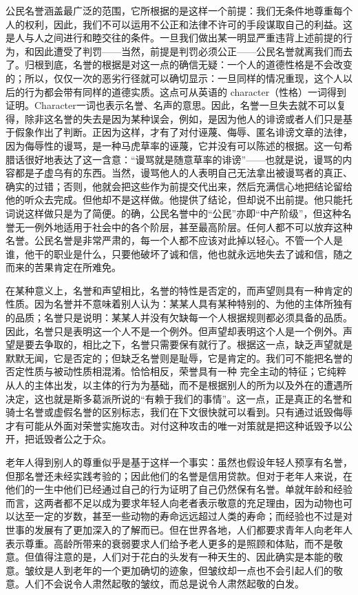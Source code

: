 \documentclass[12pt,oneside]{book}
\begin{document}
公民名誉涵盖最广泛的范围，它所根据的是这样一个前提：我们无条件地尊重每个人的权利，因此，我们不可以运用不公正和法律不许可的手段谋取自己的利益。这是人与人之间进行和睦交往的条件。一旦我们做出某一明显严重违背上述前提的行为，和因此遭受了判罚——当然，前提是判罚必须公正——公民名誉就离我们而去了。归根到底，名誉的根据是对这一点的确信无疑：一个人的道德性格是不会改变的；所以，仅仅一次的恶劣行径就可以确切显示：一旦同样的情况重现，这个人以后的行为都会带有同样的道德实质。这点可从英语的
character（性格）一词得到证明。Character一词也表示名誉、名声的意思。因此，名誉一旦失去就不可以复得，除非这名誉的失去是因为某种误会，例如，是因为他人的诽谤或者人们只是基于假象作出了判断。正因为这样，才有了对付诬蔑、侮辱、匿名诽谤文章的法律，因为侮辱性的谩骂，是一种马虎草率的诬蔑，它并没有可以陈述的根据。这一句希腊话很好地表达了这一含意：“谩骂就是随意草率的诽谤”——也就是说，谩骂的内容都是子虚乌有的东西。当然，谩骂他人的人表明自己无法拿出被谩骂者的真正、确实的过错；否则，他就会把这些作为前提交代出来，然后充满信心地把结论留给他的听众去完成。但他却不是这样做。他提供了结论，但却说不出前提。他只能托词说这样做只是为了简便。的确，公民名誉中的“公民”亦即“中产阶级”，但这种名誉无一例外地适用于社会中的各个阶层，甚至最高阶层。任何人都不可以放弃这种名誉。公民名誉是非常严肃的，每一个人都不应该对此掉以轻心。不管一个人是谁，他干的职业是什么，只要他破坏了诚和信，他也就永远地失去了诚和信，随之而来的苦果肯定在所难免。 

在某种意义上，名誉和声望相比，名誉的特性是否定的，而声望则具有一种肯定的性质。因为名誉并不意味着别人认为：某某人具有某种特别的、为他的主体所独有的品质；名誉只是说明：某某人并没有欠缺每一个人根据规则都必须具备的品质。因此，名誉只是表明这一个人不是一个例外。但声望却表明这个人是一个例外。声望是要去争取的，相比之下，名誉只需要保有就行了。根据这一点，缺乏声望就是默默无闻，它是否定的；但缺乏名誉则是耻辱，它是肯定的。我们可不能把名誉的否定性质与被动性质相混淆。恰恰相反，荣誉具有一种
完全主动的特征；它纯粹从人的主体出发，以主体的行为为基础，而不是根据别人的所为以及外在的遭遇所决定，这也就是斯多葛派所说的“有赖于我们的事情”。这一点，正是真正的名誉和骑士名誉或虚假名誉的区别标志，我们在下文很快就可以看到。只有通过诋毁侮辱才有可能从外面对荣誉实施攻击。对付这种攻击的唯一对策就是把这种诋毁予以公开，把诋毁者公之于众。 

老年人得到别人的尊重似乎是基于这样一个事实：虽然也假设年轻人预享有名誉，但那名誉还未经实践考验的；因此他们的名誉是信用贷款。但对于老年人来说，在他们的一生中他们已经通过自己的行为证明了自己仍然保有名誉。单就年龄和经验而言，这两者都不足以成为要求年轻人向老者表示敬意的充足理由，因为动物也可以达至一定的岁数，甚至一些动物的寿命远远超过人类的寿命；而经验也不过是对世事的发展有了更加深入的了解而已。但在世界各地，人们都要求青年人向老年人表示尊重。高龄所带来的衰弱要求人们给予老人更多的是照顾和体贴，而不是敬意。但值得注意的是，人们对于花白的头发有一种天生的、因此确实是本能的敬意。皱纹是人到老年的一个更加确切的迹象，但皱纹却一点也不会引起人们的敬意。人们不会说令人肃然起敬的皱纹，而总是说令人肃然起敬的白发。 
\end{document}
